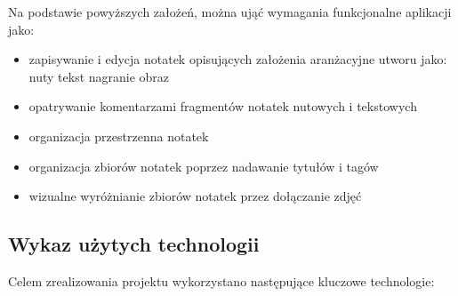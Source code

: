 \documentclass[12pt]{article}
\begin{document}
Na podstawie powyższych założeń, można ująć wymagania funkcjonalne aplikacji jako:
\begin{itemize}
	\item zapisywanie i edycja notatek opisujących założenia aranżacyjne utworu jako:
	      \subitem nuty
	      \subitem tekst
	      \subitem nagranie
	      \subitem obraz
	\item opatrywanie komentarzami fragmentów notatek nutowych i tekstowych
	\item organizacja przestrzenna notatek
	\item organizacja zbiorów notatek poprzez nadawanie tytułów i tagów
	\item wizualne wyróżnianie zbiorów notatek przez dołączanie zdjęć
\end{itemize}

\subsection{Wykaz użytych technologii}
Celem zrealizowania projektu wykorzystano następujące kluczowe technologie:
\end{document}
